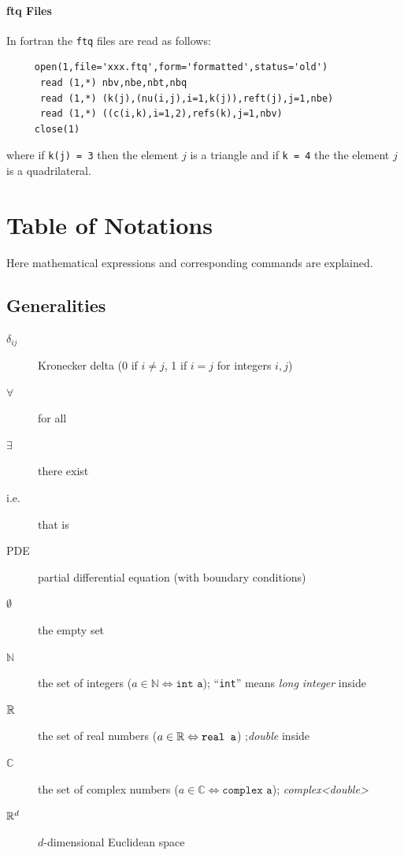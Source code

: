 \documentclass[a4paper,twoside,12pt]{book}
\def\C{\mathbb{C}}
\def\N{\mathbb{N}}
\begin{document}
\paragraph{ftq Files}\label{FTQ}
In fortran the  {\tt ftq}  files are read as follows:
\begin{verbatim}
     open(1,file='xxx.ftq',form='formatted',status='old')
      read (1,*) nbv,nbe,nbt,nbq
      read (1,*) (k(j),(nu(i,j),i=1,k(j)),reft(j),j=1,nbe)
      read (1,*) ((c(i,k),i=1,2),refs(k),j=1,nbv)
     close(1)
\end{verbatim}
where   if {\tt  k(j) = 3} then the element $j$  is  a triangle and if {\tt k = 4}
the the element $j$   is a quadrilateral.

{\small}

\appendix
\section{Table of Notations}
Here mathematical expressions and corresponding \freefempp commands are explained.
\subsection{Generalities}
\begin{description}
  \item[$\delta_{ij}$] Kronecker delta ($0$ if $i\neq j$, 1 if $i=j$ for integers $i,j$)
  \item[$\forall$] for all
  \item[$\exists$] there exist
  \item[i.e.] that is
  \item[PDE] partial differential equation (with boundary conditions)
  \item[$\emptyset$] the empty set
  \item[$\N$] the set of integers ($a\in \N\Leftrightarrow \texttt{int a}$);
  ``\texttt{int}'' means \emph{long integer} inside \freefempp
  \item[$\mathbb{R}$] the set of real numbers ($a\in \mathbb{R}\Leftrightarrow \texttt{real a}$)  ;\emph{double} inside \freefempp
  \item[$\C$] the set of complex numbers ($a\in \C\Leftrightarrow \texttt{complex a}$);
  \emph{complex<double>}
  \item[$\mathbb{R}^d$] $d$-dimensional Euclidean space
\end{description}
\end{document}
